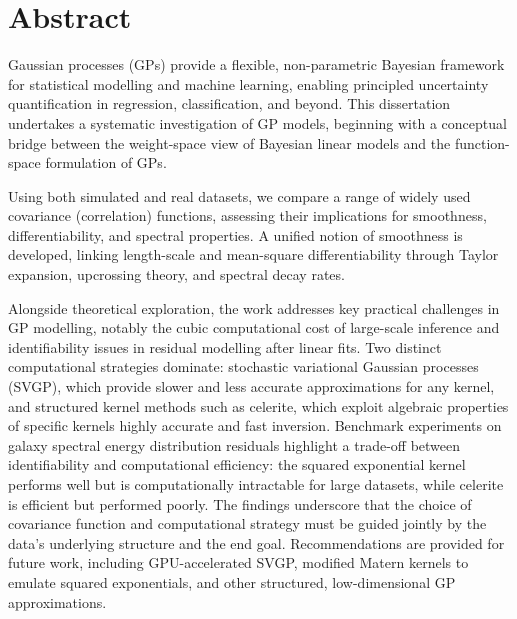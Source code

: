 \section*{Abstract}
Gaussian processes (GPs) provide a flexible, non-parametric Bayesian framework for statistical modelling and machine learning, enabling principled uncertainty quantification in regression, classification, and beyond. This dissertation undertakes a systematic investigation of GP models, beginning with a conceptual bridge between the weight-space view of Bayesian linear models and the function-space formulation of GPs. 

Using both simulated and real datasets, we compare a range of widely used covariance (correlation) functions, assessing their implications for smoothness, differentiability, and spectral properties. A unified notion of smoothness is developed, linking length-scale and mean-square differentiability through Taylor expansion, upcrossing theory, and spectral decay rates.

Alongside theoretical exploration, the work addresses key practical challenges in GP modelling, notably the cubic computational cost of large-scale inference and identifiability issues in residual modelling after linear fits. Two distinct computational strategies dominate: stochastic variational Gaussian processes (SVGP), which provide slower and less accurate approximations for any kernel, and structured kernel methods such as celerite, which exploit algebraic properties of specific kernels highly accurate and fast inversion. 
Benchmark experiments on galaxy spectral energy distribution residuals highlight a trade-off between identifiability and computational efficiency: the squared exponential kernel performs well but is computationally intractable for large datasets, while celerite is efficient but performed poorly. The findings underscore that the choice of covariance function and computational strategy must be guided jointly by the data's underlying structure and the end goal. Recommendations are provided for future work, including GPU-accelerated SVGP, modified Matern kernels to emulate squared exponentials, and other structured, low-dimensional GP approximations. 

